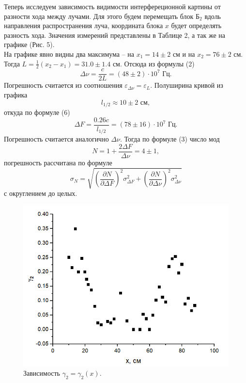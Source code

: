 \documentclass[a4paper,12pt]{article}
\begin{document}
Теперь исследуем зависимость видимости интерфереционной картины от разности хода между лучами. Для этого будем перемещать блок $\text{Б}_2$ вдоль направления распространения луча, координата блока $x$ будет определять разность хода. Значения измерений представлены в Таблице 2, а так же на графике (Рис. 5).\\
На графике явно видны два максимума -- на $x_1 = 14\pm 2 \text{ см}$ и на $x_2 = 76 \pm 2 \text{ см}$. Тогда $L = \frac{1}{2}(x_2 - x_1) = 31.0 \pm 1.4 \text{ см}$. Отсюда из формулы (2)
$$
\Delta \nu = \dfrac{c}{2L} = (48 \pm 2) \cdot 10^7 \text{ Гц}.
$$
Погрешность считается из соотношения $\varepsilon_{\Delta\nu} = \varepsilon_{L}$. Полуширина кривой из графика
$$
l_{1/2} \approx 10 \pm 2 \text{ см},
$$
откуда по формуле (6)
$$
\Delta F = \dfrac{0.26 c}{l_{1/2}} = (78 \pm 16) \cdot 10^7 \text{ Гц}.
$$
Погрешность считается аналогично $\Delta \nu$. Тогда по формуле (3) число мод
$$
N = 1 + \dfrac{2\Delta F}{\Delta \nu} = 4 \pm 1,
$$
погрешность рассчитана по формуле
$$
\sigma_N = \sqrt{\left( \dfrac{\partial N}{\partial \Delta F} \right)^2 \sigma^2_{\Delta F} + \left( \dfrac{\partial N}{\partial \Delta \nu} \right)^2 \sigma^2_{\Delta \nu}}
$$
с округлением до целых.
\begin{figure}[h]
\includegraphics[scale=0.8]{5.png}
\centering
\caption{Зависимость $\gamma_2 = \gamma_2(x)$.}
\end{figure}
\end{document}
